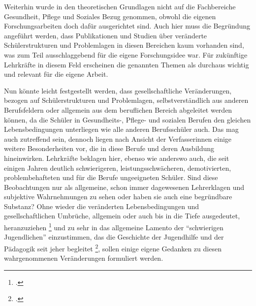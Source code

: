 Weiterhin wurde in den theoretischen Grundlagen nicht auf die Fachbereiche Gesundheit, Pflege und Soziales Bezug genommen, obwohl die eigenen Forschungsarbeiten doch dafür ausgerichtet sind. Auch hier muss die Begründung angeführt werden, dass Publikationen und Studien über veränderte Schülerstrukturen und Problemlagen in diesen Bereichen kaum vorhanden sind, was zum Teil ausschlaggebend für die eigene Forschungsidee war. Für zukünftige Lehrkräfte in diesem Feld erscheinen die genannten Themen als durchaus wichtig und relevant für die eigene Arbeit.

Nun könnte leicht festgestellt werden, dass gesellschaftliche Veränderungen, bezogen auf Schülerstrukturen und Problemlagen, selbstverständlich aus anderen Berufsfeldern oder allgemein aus dem beruflichen Bereich abgeleitet werden können, da die Schüler in Gesundheits-, Pflege- und sozialen Berufen den gleichen Lebensbedingungen unterliegen wie alle anderen Berufsschüler auch. Das mag auch zutreffend sein, dennoch liegen nach Ansicht der Verfasserinnen einige weitere Besonderheiten vor, die in diese Berufe und deren Ausbildung hineinwirken. Lehrkräfte beklagen hier, ebenso wie anderswo auch, die seit einigen Jahren deutlich schwierigeren, leistungsschwächeren, demotivierten, problembehafteten und für die Berufe ungeeigneten Schüler. Sind diese Beobachtungen nur als allgemeine, schon immer dagewesenen Lehrerklagen und subjektive Wahrnehmungen zu sehen oder haben sie auch eine begründbare Substanz? Ohne wieder die veränderten Lebensbedingungen und gesellschaftlichen Umbrüche, allgemein oder auch bis in die Tiefe ausgedeutet, heranzuziehen \footcite[vgl.][37ff]{BundesministeriumFamilie2013} und zu sehr in das allgemeine Lamento der "`schwierigen Jugendlichen"' einzustimmen, das die Geschichte der Jugendhilfe und der Pädagogik seit jeher begleitet \footcite[vgl.][144]{UniversitaetLeipzig2007}, sollen einige eigene Gedanken zu diesen wahrgenommenen Veränderungen formuliert werden. 

